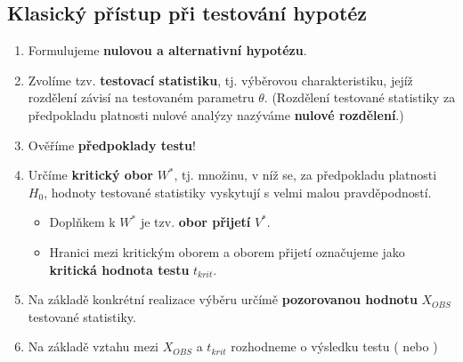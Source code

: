 \subsection{Klasický přístup při testování hypotéz}
\begin{enumerate}
    \item Formulujeme \textbf{nulovou a alternativní hypotézu}.
    \item Zvolíme tzv. \textbf{testovací statistiku}, tj. výběrovou charakteristiku, jejíž rozdělení závisí na testovaném parametru $\theta$. (Rozdělení testované statistiky za předpokladu platnosti nulové analýzy nazýváme \textbf{nulové rozdělení}.)
    \item Ověříme \textbf{předpoklady testu}! %
    \item Určíme \textbf{kritický obor} $W^*$, tj. množinu, v níž se, za předpokladu platnosti $H_0$, hodnoty testované statistiky vyskytují s velmi malou pravděpodností.
          \begin{itemize}
              \item Doplňkem k $W^*$ je tzv. \textbf{obor přijetí} $V^*$.
              \item Hranici mezi kritickým oborem a oborem přijetí označujeme jako \textbf{kritická hodnota testu} $t_{krit}$.
          \end{itemize}
    \item Na základě konkrétní realizace výběru určímě \textbf{pozorovanou hodnotu} $X_{OBS}$ testované statistiky.
    \item Na základě vztahu mezi $X_{OBS}$ a $t_{krit}$ rozhodneme o výsledku testu ( nebo )
\end{enumerate}

